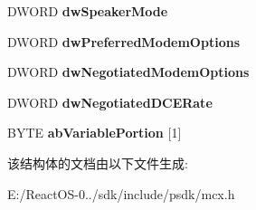 \begin{DoxyCompactItemize}
D\+W\+O\+RD {\bfseries dw\+Speaker\+Mode}
\item 
\mbox{\label{struct___m_o_d_e_m_s_e_t_t_i_n_g_s_a4ecfae47a89a81a77b9731e2e7533165}} 
D\+W\+O\+RD {\bfseries dw\+Preferred\+Modem\+Options}
\item 
\mbox{\label{struct___m_o_d_e_m_s_e_t_t_i_n_g_s_ac5f6ac881b199dcc102ac48fde594813}} 
D\+W\+O\+RD {\bfseries dw\+Negotiated\+Modem\+Options}
\item 
\mbox{\label{struct___m_o_d_e_m_s_e_t_t_i_n_g_s_a56bd2ad7e6bb1c0d8696737ee1e871e3}} 
D\+W\+O\+RD {\bfseries dw\+Negotiated\+D\+C\+E\+Rate}
\item 
\mbox{\label{struct___m_o_d_e_m_s_e_t_t_i_n_g_s_af8a2af09efb3a2693d63c04a50a522b2}} 
B\+Y\+TE {\bfseries ab\+Variable\+Portion} \mbox{[}1\mbox{]}
\end{DoxyCompactItemize}


该结构体的文档由以下文件生成\+:\begin{DoxyCompactItemize}
\item 
E\+:/\+React\+O\+S-\/0../sdk/include/psdk/mcx.\+h\end{DoxyCompactItemize}
